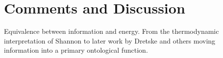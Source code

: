 \section{Comments and Discussion}

Equivalence between information and energy. From the thermodynamic interpretation of Shannon to later work by Dretske and others moving information into a primary ontological function.
